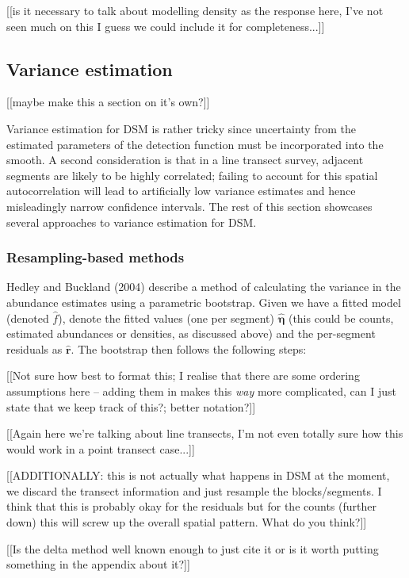 \documentclass[useAMS,referee]{biom}
\begin{document}
[[is it necessary to talk about modelling density as the response here, I've not seen much on this I guess we could include it for completeness...]]


\subsection{Variance estimation}
[[maybe make this a section on it's own?]]

Variance estimation for DSM is rather tricky since uncertainty from the estimated parameters of the detection function must be incorporated into the smooth. A second consideration is that in a line transect survey, adjacent segments are likely to be highly correlated; failing to account for this spatial autocorrelation will lead to artificially low variance estimates and hence misleadingly narrow confidence intervals. The rest of this section showcases several approaches to variance estimation for DSM.

\subsubsection{Resampling-based methods}

Hedley and Buckland (2004) describe a method of calculating the variance in the abundance estimates using a parametric bootstrap. Given we have a fitted model (denoted $\hat{f}$), denote the fitted values (one per segment) $\hat{\bm{\eta}}$ (this could be counts, estimated abundances or densities, as discussed above) and the per-segment residuals as $\hat{\mathbf{r}}$. The bootstrap then follows the following steps:

[[Not sure how best to format this; I realise that there are some ordering assumptions here -- adding them in makes this \textit{way} more complicated, can I just state that we keep track of this?; better notation?]]

[[Again here we're talking about line transects, I'm not even totally sure how this would work in a point transect case...]]

[[ADDITIONALLY: this is not actually what happens in DSM at the moment, we discard the transect information and just resample the blocks/segments. I think that this is probably okay for the residuals but for the counts (further down) this will screw up the overall spatial pattern. What do you think?]]

[[Is the delta method well known enough to just cite it or is it worth putting something in the appendix about it?]]
\end{document}
